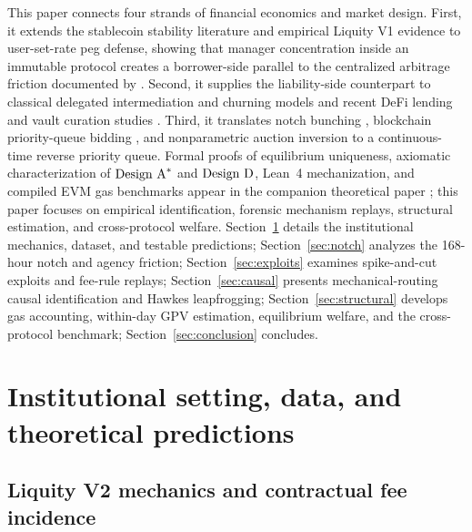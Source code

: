 This paper connects four strands of financial economics and market design. First, it extends the stablecoin stability literature \citep{davernas2026can,ma2026stablecoin,goel2026making,aldasoro2026stablecoin,klagesmundt2022while,lyons2023what,deblasis2023intelligent,ling2025sok} and empirical Liquity V1 evidence \citep{genc2026a,genc2026b} to user-set-rate peg defense, showing that manager concentration inside an immutable protocol creates a borrower-side parallel to the centralized arbitrage friction documented by \citet{ma2026stablecoin}. Second, it supplies the liability-side counterpart to classical delegated intermediation and churning models \citep{diamond1984financial,holmstrom1997financial,allen1993churning,admati1997does,scharfstein1990herd} and recent DeFi lending and vault curation studies \citep{gudgeon2020defi,schar2021defi,aramonte2021defi,cornelli2025why,chitra2025curationary,zbandut2025institutionalizing,mancino2026sok}. Third, it translates notch bunching \citep{kleven2013using}, blockchain priority-queue bidding \citep{afeche2004pricing,huberman2021monopoly}, and nonparametric auction inversion \citep{guerre2000optimal} to a continuous-time reverse priority queue. Formal proofs of equilibrium uniqueness, axiomatic characterization of $\text{Design A}^*$ and $\text{Design D}$, Lean~4 mechanization, and compiled EVM gas benchmarks appear in the companion theoretical paper \citep{companion2026}; this paper focuses on empirical identification, forensic mechanism replays, structural estimation, and cross-protocol welfare. Section~\ref{sec:setting} details the institutional mechanics, dataset, and testable predictions; Section~\ref{sec:notch} analyzes the 168-hour notch and agency friction; Section~\ref{sec:exploits} examines spike-and-cut exploits and fee-rule replays; Section~\ref{sec:causal} presents mechanical-routing causal identification and Hawkes leapfrogging; Section~\ref{sec:structural} develops gas accounting, within-day GPV estimation, equilibrium welfare, and the cross-protocol benchmark; Section~\ref{sec:conclusion} concludes.

\section{Institutional setting, data, and theoretical predictions}\label{sec:setting}

\subsection{Liquity V2 mechanics and contractual fee incidence}\label{subsec:mechanics}

